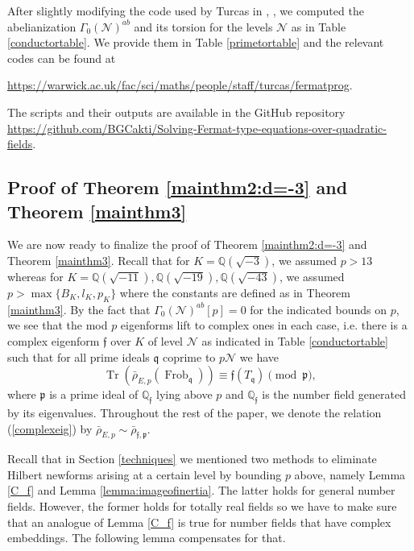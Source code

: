 \documentclass[]{article}
\newcommand {\QQ}{{\mathbb{Q}}}
\begin{document}
After slightly modifying the code used by Turcas in \cite{cturcacs2018fermat}, \cite{cturcacs2020serre}, we computed the abelianization $\Gamma_0(\mathcal{N})^{a b}$ and its torsion for the levels $\mathcal{N}$ as in Table \ref{conductortable}. We provide them in Table \ref{primetortable} and the relevant codes can be found at 
\begin{center}
\url{https://warwick.ac.uk/fac/sci/maths/people/staff/turcas/fermatprog}.
\end{center}The scripts and their outputs are available in the GitHub repository \url{https://github.com/BGCakti/Solving-Fermat-type-equations-over-quadratic-fields}.

\subsection{Proof of Theorem \ref{mainthm2:d=-3} and Theorem \ref{mainthm3}}\label{pfthm3}

We are now ready to finalize the proof of Theorem \ref{mainthm2:d=-3} and Theorem \ref{mainthm3}. Recall that for $K=\QQ(\sqrt{-3})$, we assumed $p>13$ whereas for $K=\QQ(\sqrt{-11}),\QQ(\sqrt{-19}),\QQ(\sqrt{-43})$, we assumed $p>\max\{B_K,l_K,p_K\}$ where the constants are defined as in Theorem \ref{mainthm3}. By the fact that $\Gamma_0(\mathcal{N})^{a b}[p]=0$ for the indicated bounds on $p$, we see that the mod $p$ eigenforms lift to complex ones in each case, i.e. there is a complex eigenform $\mathfrak{f}$ over $K$ of level $\mathcal{N}$ as indicated in Table \ref{conductortable} such that for all prime ideals $\mathfrak{q}$ coprime to $p \mathcal{N}$ we have
\begin{equation}\label{complexeig}
\operatorname{Tr}\left(\bar{\rho}_{E, p}\left(\operatorname{Frob}_{\mathfrak{q}}\right)\right) \equiv \mathfrak{f}\left(T_{\mathfrak{q}}\right) \pmod{\mathfrak{p}},   
\end{equation}where $\mathfrak{p}$ is a prime ideal of $\mathbb{Q}_{\mathfrak{f}}$ lying above $p$ and $\mathbb{Q}_{\mathfrak{f}}$ is the number field generated by its eigenvalues. Throughout the rest of the paper, we denote the relation (\ref{complexeig}) by $\bar{\rho}_{E, p} \sim \bar{\rho}_{\mathfrak{f}, \mathfrak{p}}
$.

Recall that in Section \ref{techniques} we mentioned two methods to eliminate Hilbert newforms arising at a certain level by bounding $p$ above, namely Lemma \ref{C_f} and Lemma \ref{lemma:imageofinertia}. The latter holds for general number fields. However, the former holds for totally real fields so we have to make sure that an analogue of Lemma \ref{C_f} is true for number fields that have complex embeddings. The following lemma compensates for that. 
\end{document}
